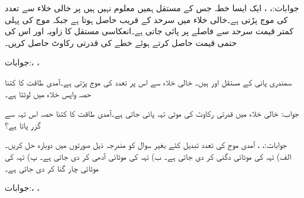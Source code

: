 جوابات:، ، 
ایک ایسا خطہ جس کے مستقل ہمیں معلوم نہیں ہیں پر خالی خلاء سے  تعدد کی موج پڑتی ہے۔خالی خلاء میں سرحد کے قریب  حاصل ہوتا ہے جبکہ موج کی پہلی کمتر قیمت سرحد سے  فاصلے پر پائی جاتی ہے۔انعکاسی مستقل کا زاویہ  اور اس کی حتمی قیمت  حاصل کرتے ہوئے خطے کی قدرتی رکاوٹ حاصل کریں۔

جوابات:، ،    

سمندری پانی کے مستقل  اور  ہیں۔ خالی خلاء سے اس پر  تعدد کی موج پڑتی ہے۔آمدی طاقت کا کتنا حصہ واپس خلاء میں لوٹتا ہے۔

جواب: 
خالی خلاء میں  قدرتی رکاوٹ کی  موٹی تہہ پائی جاتی ہے۔آمدی طاقت کا کتنا حصہ اس تہہ سے گزر پاتا ہے؟ 

جوابات:، ،  
آمدی موج کی تعدد تبدیل کئے بغیر سوال  کو مندرجہ ذیل صورتوں میں دوبارہ حل کریں۔ الف) تہہ کی موٹائی دگنی کر دی جاتی ہے۔ ب) تہہ کی موٹائی آدھی کر دی جاتی ہے۔ پ) تہہ کی موٹائی  چار گنا کر دی جاتی ہے۔

جوابات:، ، 

